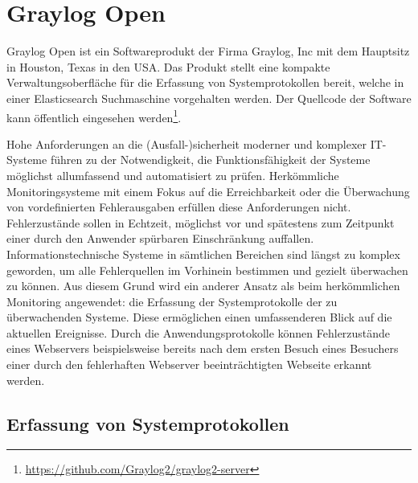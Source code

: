 \section{Graylog Open}

Graylog Open ist ein Softwareprodukt der Firma Graylog, Inc mit dem Hauptsitz in Houston, Texas in den USA. Das Produkt stellt eine kompakte Verwaltungsoberfläche für die Erfassung von Systemprotokollen bereit, welche in einer Elasticsearch Suchmaschine vorgehalten werden. Der Quellcode der Software kann öffentlich eingesehen werden\footnote{\url{https://github.com/Graylog2/graylog2-server}}. 

Hohe Anforderungen an die (Ausfall-)sicherheit moderner und komplexer IT-Systeme führen zu der Notwendigkeit, die Funktionsfähigkeit der Systeme möglichst allumfassend und automatisiert zu prüfen. Herkömmliche Monitoringsysteme mit einem Fokus auf die Erreichbarkeit oder die Überwachung von vordefinierten Fehlerausgaben erfüllen diese Anforderungen nicht. Fehlerzustände sollen in Echtzeit, möglichst vor und spätestens zum Zeitpunkt einer durch den Anwender spürbaren Einschränkung auffallen. Informationstechnische Systeme in sämtlichen Bereichen sind längst zu komplex geworden, um alle Fehlerquellen im Vorhinein bestimmen und gezielt überwachen zu können. Aus diesem Grund wird ein anderer Ansatz als beim herkömmlichen Monitoring angewendet: die Erfassung der Systemprotokolle der zu überwachenden Systeme. Diese ermöglichen einen umfassenderen Blick auf die aktuellen Ereignisse. Durch die Anwendungsprotokolle können Fehlerzustände eines Webservers beispielsweise bereits nach dem ersten Besuch eines Besuchers einer durch den fehlerhaften Webserver beeinträchtigten Webseite erkannt werden.

\subsection{Erfassung von Systemprotokollen}
\label{sec:erfassung-systemprotokolle}

